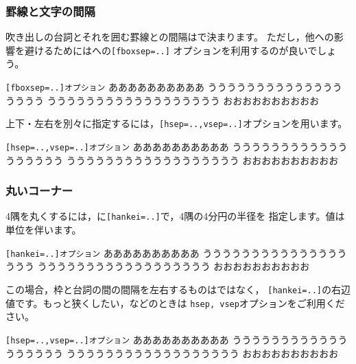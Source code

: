 \subsubsection{罫線と文字の間隔}
吹き出しの台詞とそれを囲む罫線との間隔はで決まります。
ただし，他への影響を避けるためにはへの\verb+[fboxsep=..]+
オプションを利用するのが良いでしょう。

\begin{showEx}{\texttt{[fboxsep=..]オプション}}
ああああああああああ%
%
うううううううううううううううううう
うううううううううううううううううう
おおおおおおおおおお
\end{showEx}

上下・左右を別々に指定するには，\verb+[hsep=..,vsep=..]+オプションを用います。

\begin{showEx}{\texttt{[hsep=..,vsep=..]オプション}}
ああああああああああ%
%
うううううううううううううううううう
うううううううううううううううううう
おおおおおおおおおお
\end{showEx}

\subsubsection{丸いコーナー}
4隅を丸くするには，に\verb+[hankei=..]+で，4隅の4分円の半径を
指定します。値は単位を伴います。

\begin{showEx}{\texttt{[hankei=..]オプション}}
ああああああああああ%
%
うううううううううううううううううう
うううううううううううううううううう
おおおおおおおおおお
\end{showEx}

この場合，枠と台詞の間の間隔を左右するものはではなく，
\verb+[hankei=..]+の右辺値です。もっと狭くしたい，などのときは
\verb+hsep, vsep+オプションをご利用ください。

\begin{showEx}{\texttt{[hsep=..,vsep=..]オプション}}
ああああああああああ%
%
うううううううううううううううううう
うううううううううううううううううう
おおおおおおおおおお
\end{showEx}

